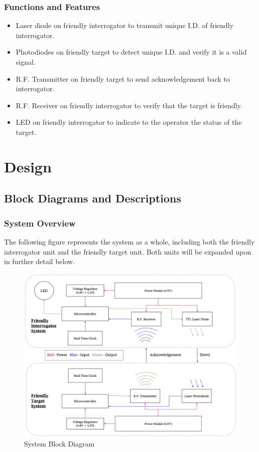 \documentclass[letterpaper,10pt]{article}
\begin{document}
\begin{spacing}{1.15}
\subsubsection{Functions and Features}
\begin{itemize}
	\item Laser diode on friendly interrogator to transmit unique I.D. of friendly interrogator.
	\item Photodiodes on friendly target to detect unique I.D. and verify it is a valid signal.
	\item R.F. Transmitter on friendly target to send acknowledgement back to interrogator.
	\item R.F. Receiver on friendly interrogator to verify that the target is friendly.
	\item LED on friendly interrogator to indicate to the operator the status of the target.
\end{itemize}
\clearpage

\section{Design}
\subsection{Block Diagrams and Descriptions}
\subsubsection{System Overview}
The following figure represents the system as a whole, including both the friendly interrogator unit and the friendly target unit. Both units will be expanded upon in further detail below.
\begin{figure} [H]
	\centering
	\includegraphics[scale=0.45]{System_Block_Diagram.png}
	\caption{System Block Diagram\label{fig:system-block-diagram}}
\end{figure}


\end{spacing}
\end{document}
